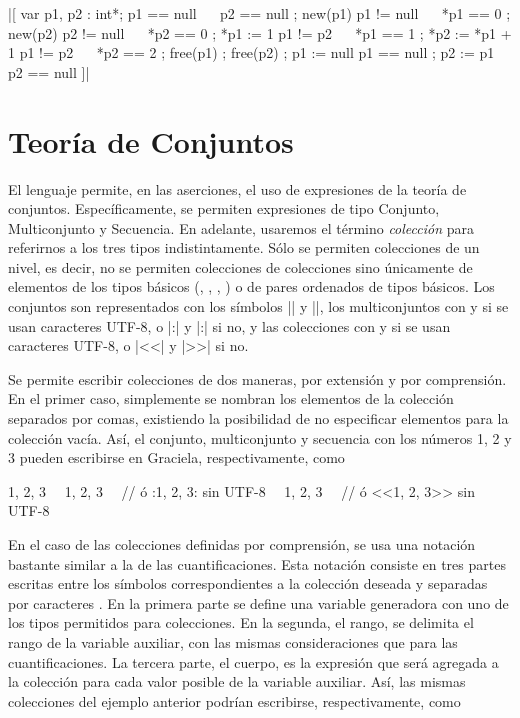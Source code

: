 \begin{gracielacode}[caption=Ejemplo del funcionamiento de apuntadores, label=lst:pointer]
|[ var p1, p2 : int*; { p1 == null ~\Land~ p2 == null }
 ; new(p1)            { p1 != null ~\Land~ *p1 == 0 }
 ; new(p2)            { p2 != null ~\Land~ *p2 == 0 }
 ; *p1 := 1           { p1 != p2 ~\Land~ *p1 == 1 }
 ; *p2 := *p1 + 1     { p1 != p2 ~\Land~ *p2 == 2 }
 ; free(p1)
 ; free(p2)
 ; p1 := null         { p1 == null }
 ; p2 := p1           { p2 == null }
]|
\end{gracielacode}

\section{Teoría de Conjuntos}

El lenguaje permite, en las aserciones, el uso de expresiones de la teoría de
conjuntos. Específicamente, se permiten expresiones de tipo Conjunto,
Multiconjunto y Secuencia. En adelante, usaremos el término \textit{colección}
para referirnos a los tres tipos indistintamente. Sólo se permiten colecciones
de un nivel, es decir, no se permiten colecciones de colecciones sino únicamente
de elementos de los tipos básicos (, , ,
) o de pares ordenados de tipos básicos. Los conjuntos son
representados con los símbolos \ingra|{| y \ingra|}|, los multiconjuntos con
\Lbag{} y \Rbag{} si se usan caracteres UTF-8, o \ingra|{:| y \ingra|:}| si no, y
las colecciones con \Lseq{} y \Rseq{} si se usan caracteres UTF-8, o \ingra|<<| y
\ingra|>>| si no.

Se permite escribir colecciones de dos maneras, por extensión y por comprensión.
En el primer caso, simplemente se nombran los elementos de la colección
separados por comas, existiendo la posibilidad de no especificar elementos para
la colección vacía. Así, el conjunto, multiconjunto y secuencia con los números
1, 2 y 3 pueden escribirse en Graciela, respectivamente, como

\begin{gracielacode}
{1, 2, 3}
~\Lbag~1, 2, 3~\Rbag~ // ó {:1, 2, 3:} sin UTF-8
~\Lseq~1, 2, 3~\Rseq~ // ó <<1, 2, 3>> sin UTF-8
\end{gracielacode}

En el caso de las colecciones definidas por comprensión, se usa una notación
bastante similar a la de las cuantificaciones. Esta notación consiste en tres
partes escritas entre los símbolos correspondientes a la colección deseada y
separadas por caracteres \ingra{|}. En la primera parte se define una variable
generadora con uno de los tipos permitidos para colecciones. En la segunda, el
rango, se delimita el rango de la variable auxiliar, con las mismas
consideraciones que para las cuantificaciones. La tercera parte, el cuerpo, es
la expresión que será agregada a la colección para cada valor posible de la
variable auxiliar. Así, las mismas colecciones del ejemplo anterior podrían
escribirse, respectivamente, como

